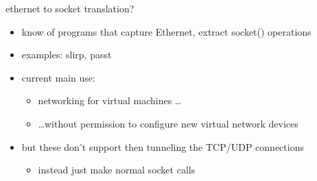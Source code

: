 
\begin{frame}{ethernet to socket translation?}
    \begin{itemize}
    \item know of programs that capture Ethernet, extract socket() operations
    \item examples: slirp, passt
    \item current main use:
        \begin{itemize}
        \item networking for virtual machines \ldots
        \item \ldots without permission to configure new virtual network devices
        \end{itemize}
    \vspace{.5cm}
    \item but these don't support then tunneling the TCP/UDP connections
        \begin{itemize}
        \item instead just make normal socket calls
        \end{itemize}
    \end{itemize}
\end{frame}

